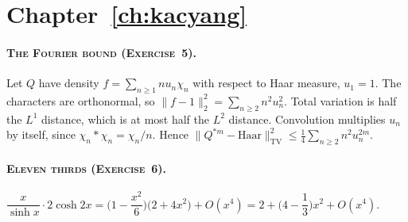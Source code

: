 \section*{Chapter~\ref{ch:kacyang}}

\paragraph{\normalfont\scshape The Fourier bound (Exercise~5).} Let $Q$ have density $f=\sum_{n\ge1}nu_n\chi_n$ with respect to Haar measure, $u_1=1$. The characters are orthonormal, so $\|f-1\|_2^2=\sum_{n\ge2}n^2u_n^2$. Total variation is half the $L^1$ distance, which is at most half the $L^2$ distance. Convolution multiplies $u_n$ by itself, since $\chi_n*\chi_n=\chi_n/n$. Hence $\|Q^{*m}-\mathrm{Haar}\|_{\mathrm{TV}}^2\le\frac14\sum_{n\ge2}n^2u_n^{2m}$.

\paragraph{\normalfont\scshape Eleven thirds (Exercise~6).} $\dfrac{x}{\sinh x}\cdot2\cosh2x=\Big(1-\dfrac{x^2}{6}\Big)\big(2+4x^2\big)+O(x^4)=2+\Big(4-\dfrac13\Big)x^2+O(x^4)$.
